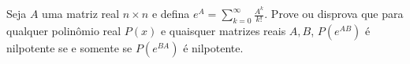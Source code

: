 Seja \(A\) uma matriz real \(n\times n\) e defina \(e^{A}=\sum_{k=0}^{\infty} \frac{A^{k}}{k!}\). Prove ou disprova que para qualquer polinômio real \(P(x)\) e quaisquer matrizes reais \(A,B\), \(P(e^{AB})\) é nilpotente se e somente se \(P(e^{BA})\) é nilpotente.
